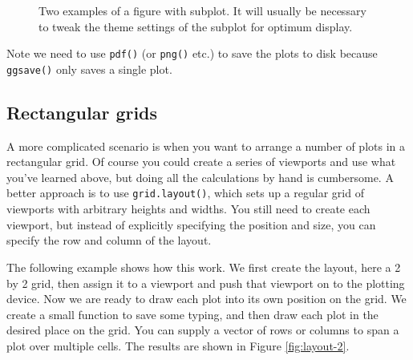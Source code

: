 \begin{figure}[htbp]
  \centering
  \caption{Two examples of a figure with subplot. It will usually be necessary to tweak the theme settings of the subplot for optimum display.}
  \label{fig:subplot}
\end{figure}

Note we need to use \texttt{pdf()} (or \texttt{png()} etc.) to save the
plots to disk because \texttt{ggsave()} only saves a single plot.

\subsection{Rectangular grids}

A more complicated scenario is when you want to arrange a number of
plots in a rectangular grid. Of course you could create a series of
viewports and use what you've learned above, but doing all the
calculations by hand is cumbersome. A better approach is to use
\texttt{grid.layout()}, which sets up a regular grid of viewports with
arbitrary heights and widths. You still need to create each viewport,
but instead of explicitly specifying the position and size, you can
specify the row and column of the layout.

The following example shows how this work. We first create the layout,
here a 2 by 2 grid, then assign it to a viewport and push that viewport
on to the plotting device. Now we are ready to draw each plot into its
own position on the grid. We create a small function to save some
typing, and then draw each plot in the desired place on the grid. You
can supply a vector of rows or columns to span a plot over multiple
cells. The results are shown in Figure \ref{fig:layout-2}.

\begin{Shaded}
\begin{Highlighting}[]
\NormalTok{()}
\NormalTok{(}\NormalTok{(} \NormalTok{(}\NormalTok{, }\NormalTok{)))}

\StringTok{ }
  \NormalTok{(}  
 \NormalTok{(}\NormalTok{, }\NormalTok{:}\NormalTok{))}
 \NormalTok{(}\NormalTok{, }\NormalTok{))}
 \NormalTok{(}\NormalTok{, }\NormalTok{))}
\end{Highlighting}
\end{Shaded}

